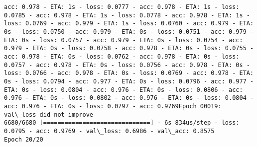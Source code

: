 \documentclass[11pt]{article}
\begin{document}
\begin{Verbatim}[commandchars=\\\{\}]
acc: 0.978 - ETA: 1s - loss: 0.0777 - acc: 0.978 - ETA: 1s - loss: 0.0785 - acc: 0.978 - ETA: 1s - loss: 0.0778 - acc: 0.978 - ETA: 1s - loss: 0.0769 - acc: 0.979 - ETA: 1s - loss: 0.0760 - acc: 0.979 - ETA: 0s - loss: 0.0750 - acc: 0.979 - ETA: 0s - loss: 0.0751 - acc: 0.979 - ETA: 0s - loss: 0.0757 - acc: 0.979 - ETA: 0s - loss: 0.0754 - acc: 0.979 - ETA: 0s - loss: 0.0758 - acc: 0.978 - ETA: 0s - loss: 0.0755 - acc: 0.978 - ETA: 0s - loss: 0.0762 - acc: 0.978 - ETA: 0s - loss: 0.0757 - acc: 0.978 - ETA: 0s - loss: 0.0756 - acc: 0.978 - ETA: 0s - loss: 0.0766 - acc: 0.978 - ETA: 0s - loss: 0.0769 - acc: 0.978 - ETA: 0s - loss: 0.0794 - acc: 0.977 - ETA: 0s - loss: 0.0796 - acc: 0.977 - ETA: 0s - loss: 0.0804 - acc: 0.976 - ETA: 0s - loss: 0.0806 - acc: 0.976 - ETA: 0s - loss: 0.0802 - acc: 0.976 - ETA: 0s - loss: 0.0804 - acc: 0.976 - ETA: 0s - loss: 0.0797 - acc: 0.9769Epoch 00019: val\_loss did not improve
6680/6680 [==============================] - 6s 834us/step - loss: 0.0795 - acc: 0.9769 - val\_loss: 0.6986 - val\_acc: 0.8575
Epoch 20/20

\end{Verbatim}
\end{document}

